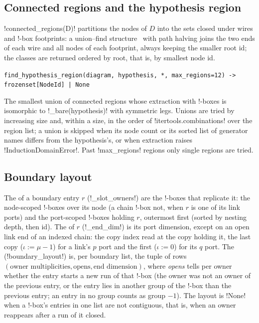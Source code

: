 \subsection{Connected regions and the hypothesis region}

\py!connected_regions(D)! partitions the nodes of $D$ into the sets closed under wires and !-box footprints: a union--find structure~\cite{tarjan1975unionfind} with path halving joins the two ends of each wire and all nodes of each footprint, always keeping the smaller root id; the classes are returned ordered by root, that is, by smallest node id.

\begin{signature}
\texttt{find\_\allowbreak{}hypothesis\_\allowbreak{}region(\allowbreak{}diagram,\allowbreak{} hypothesis,\allowbreak{} *,\allowbreak{} max\_\allowbreak{}regions=12) -> frozenset[NodeId] | None}

The smallest union of connected regions whose extraction with !-boxes is isomorphic to \py!_bare(hypothesis)! with symmetric legs. Unions are tried by increasing size and, within a size, in the order of \py!itertools.combinations! over the region list; a union is skipped when its node count or its sorted list of generator names differs from the hypothesis's, or when extraction raises \py!InductionDomainError!. Past \code!max_regions! regions only single regions are tried.
\end{signature}

\subsection{Boundary layout}\label{sec:kernel-layout}

\begin{definition}\label{def:kernel-layout}
The  of a boundary entry $r$ (\py!_slot_owners!) are the !-boxes that replicate it: the node-scoped !-boxes over its node (a chain !-box not, when $r$ is one of its link ports) and the port-scoped !-boxes holding $r$, outermost first (sorted by nesting depth, then id). The  of $r$ (\py!_end_dim!) is its port dimension, except on an open link end of an indexed chain: the copy index read at the copy holding it, the last copy ($\iota := \mu-1$) for a link's $p$ port and the first ($\iota:=0$) for its $q$ port. The  (\py!boundary_layout!) is, per boundary list, the tuple of rows $(\text{owner multiplicities}, \text{opens}, \text{end dimension})$, where \emph{opens} tells per owner whether the entry starts a new run of that !-box (the owner was not an owner of the previous entry, or the entry lies in another group of the !-box than the previous entry; an entry in no group counts as group $-1$). The layout is \py!None! when a !-box's entries in one list are not contiguous, that is, when an owner reappears after a run of it closed.
\end{definition}

